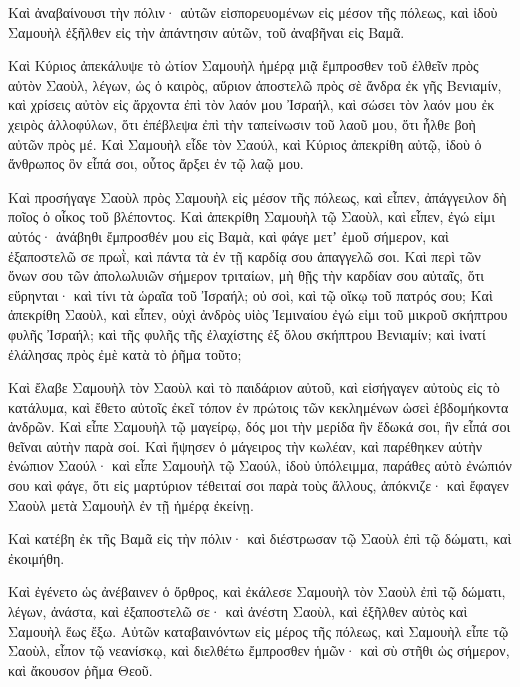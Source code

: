{Καὶ ἀναβαίνουσι τὴν πόλιν· αὐτῶν εἰσπορευομένων εἰς μέσον τῆς πόλεως, καὶ ἰδοὺ Σαμουὴλ ἐξῆλθεν εἰς τὴν ἀπάντησιν αὐτῶν, τοῦ ἀναβῆναι εἰς Βαμᾶ.
\par }{\PP {}Καὶ Κύριος ἀπεκάλυψε τὸ ὠτίον Σαμουὴλ ἡμέρᾳ μιᾷ ἔμπροσθεν τοῦ ἐλθεῖν πρὸς αὐτὸν Σαοὺλ, λέγων,
ὡς ὁ καιρὸς, αὔριον ἀποστελῶ πρὸς σὲ ἄνδρα ἐκ γῆς Βενιαμίν, καὶ χρίσεις αὐτὸν εἰς ἄρχοντα ἐπὶ τὸν λαόν μου Ἰσραήλ, καὶ σώσει τὸν λαόν μου ἐκ χειρὸς ἀλλοφύλων, ὅτι ἐπέβλεψα ἐπὶ τὴν ταπείνωσιν τοῦ λαοῦ μου, ὅτι ἦλθε βοὴ αὐτῶν πρὸς μέ.
Καὶ Σαμουὴλ εἶδε τὸν Σαούλ, καὶ Κύριος ἀπεκρίθη αὐτῷ, ἰδοὺ ὁ ἄνθρωπος ὃν εἶπά σοι, οὗτος ἄρξει ἐν τῷ λαῷ μου.
\par }{\PP {}Καὶ προσήγαγε Σαοὺλ πρὸς Σαμουὴλ εἰς μέσον τῆς πόλεως, καὶ εἶπεν, ἀπάγγειλον δὴ ποῖος ὁ οἶκος τοῦ βλέποντος.
Καὶ ἀπεκρίθη Σαμουὴλ τῷ Σαοὺλ, καὶ εἶπεν, ἐγώ εἰμι αὐτός· ἀνάβηθι ἔμπροσθέν μου εἰς Βαμὰ, καὶ φάγε μετʼ ἐμοῦ σήμερον, καὶ ἐξαποστελῶ σε πρωῒ, καὶ πάντα τὰ ἐν τῇ καρδίᾳ σου ἀπαγγελῶ σοι.
Καὶ περὶ τῶν ὄνων σου τῶν ἀπολωλυιῶν σήμερον τριταίων, μὴ θῇς τὴν καρδίαν σου αὐταῖς, ὅτι εὕρηνται· καὶ τίνι τὰ ὡραῖα τοῦ Ἰσραήλ; οὐ σοὶ, καὶ τῷ οἴκῳ τοῦ πατρός σου;
Καὶ ἀπεκρίθη Σαοὺλ, καὶ εἶπεν, οὐχὶ ἀνδρὸς υἱὸς Ἰεμιναίου ἐγώ εἰμι τοῦ μικροῦ σκήπτρου φυλῆς Ἰσραήλ; καὶ τῆς φυλῆς τῆς ἐλαχίστης ἐξ ὅλου σκήπτρου Βενιαμίν; καὶ ἱνατί ἐλάλησας πρὸς ἐμὲ κατὰ τὸ ῥῆμα τοῦτο;
\par }{\PP {}Καὶ ἔλαβε Σαμουὴλ τὸν Σαοὺλ καὶ τὸ παιδάριον αὐτοῦ, καὶ εἰσήγαγεν αὐτοὺς εἰς τὸ κατάλυμα, καὶ ἔθετο αὐτοῖς ἐκεῖ τόπον ἐν πρώτοις τῶν κεκλημένων ὡσεὶ ἑβδομήκοντα ἀνδρῶν.
Καὶ εἶπε Σαμουὴλ τῷ μαγείρῳ, δός μοι τὴν μερίδα ἣν ἔδωκά σοι, ἣν εἶπά σοι θεῖναι αὐτὴν παρὰ σοί.
Καὶ ἥψησεν ὁ μάγειρος τὴν κωλέαν, καὶ παρέθηκεν αὐτὴν ἐνώπιον Σαούλ· καὶ εἶπε Σαμουὴλ τῷ Σαούλ, ἰδοὺ ὑπόλειμμα, παράθες αὐτὸ ἐνώπιόν σου καὶ φάγε, ὅτι εἰς μαρτύριον τέθειταί σοι παρὰ τοὺς ἄλλους, ἀπόκνιζε· καὶ ἔφαγεν Σαοὺλ μετὰ Σαμουὴλ ἐν τῇ ἡμέρᾳ ἐκείνῃ.
\par }{\PP {}Καὶ κατέβη ἐκ τῆς Βαμᾶ εἰς τὴν πόλιν· καὶ διέστρωσαν τῷ Σαοὺλ ἐπὶ τῷ δώματι, καὶ ἐκοιμήθη.
\par }{\PP {}Καὶ ἐγένετο ὡς ἀνέβαινεν ὁ ὄρθρος, καὶ ἐκάλεσε Σαμουὴλ τὸν Σαοὺλ ἐπὶ τῷ δώματι, λέγων, ἀνάστα, καὶ ἐξαποστελῶ σε· καὶ ἀνέστη Σαοὺλ, καὶ ἐξῆλθεν αὐτὸς καὶ Σαμουὴλ ἕως ἔξω.
Αὐτῶν καταβαινόντων εἰς μέρος τῆς πόλεως, καὶ Σαμουὴλ εἶπε τῷ Σαοὺλ, εἶπον τῷ νεανίσκῳ, καὶ διελθέτω ἔμπροσθεν ἡμῶν· καὶ σὺ στῆθι ὡς σήμερον, καὶ ἄκουσον ῥῆμα Θεοῦ.

}
